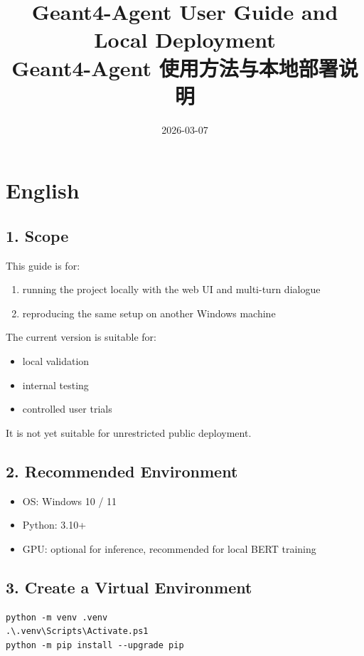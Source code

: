 \documentclass[11pt,a4paper]{ctexart}
\title{Geant4-Agent User Guide and Local Deployment\\Geant4-Agent 使用方法与本地部署说明}
\author{}
\date{2026-03-07}
\begin{document}
\maketitle

\section*{English}

\subsection*{1. Scope}

This guide is for:

\begin{enumerate}
\item running the project locally with the web UI and multi-turn dialogue
\item reproducing the same setup on another Windows machine
\end{enumerate}

The current version is suitable for:

\begin{itemize}
\item local validation
\item internal testing
\item controlled user trials
\end{itemize}

It is not yet suitable for unrestricted public deployment.

\subsection*{2. Recommended Environment}

\begin{itemize}
\item OS: Windows 10 / 11
\item Python: 3.10+
\item GPU: optional for inference, recommended for local BERT training
\end{itemize}

\subsection*{3. Create a Virtual Environment}

\begin{verbatim}
python -m venv .venv
.\.venv\Scripts\Activate.ps1
python -m pip install --upgrade pip
\end{verbatim}
\end{document}
